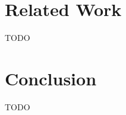 \documentclass[letterpaper,twocolumn,10pt]{article}
\begin{document}
\section{Related Work}
TODO

\section{Conclusion}
TODO





\end{document}
